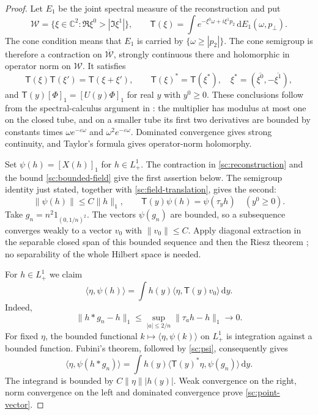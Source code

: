 \documentclass[11pt,letterpaper,reqno]{amsart}
\theoremstyle{definition}
\theoremstyle{remark}
\begin{document}
\begin{proof}
Let $E_1$ be the joint spectral measure of the reconstruction and
put
\[
\mathcal W=\{\xi\in\mathbb C^2:\Re\xi^0>|\Im\xi^1|\},\qquad
\mathsf T(\xi)=\int e^{-\xi^0\omega+i\xi^1p_2}\,
 \mathrm dE_1(\omega,p_\perp).
\]
The cone condition means that $E_1$ is carried by
$\{\omega\ge|p_2|\}$. The cone semigroup is therefore a contraction on
$\overline{\mathcal W}$, strongly continuous there and holomorphic in
operator norm on $\mathcal W$. It satisfies
\[
\mathsf T(\xi)\mathsf T(\xi')=\mathsf T(\xi+\xi'),\qquad
\mathsf T(\xi)^*=\mathsf T(\xi^*),\quad
\xi^*=(\overline{\xi^0},-\overline{\xi^1}),
\]
and $\mathsf T(y)[\Phi]_1=[U(y)\Phi]_1$ for real $y$ with $y^0\ge0$.
These conclusions follow from the spectral-calculus argument in
\cite[Section~8.2]{QEDCurrent}: the multiplier has modulus at most
one on the closed tube, and on a smaller tube its first two
derivatives are bounded by constants times
$\omega e^{-\varepsilon\omega}$ and
$\omega^2e^{-\varepsilon\omega}$. Dominated convergence gives
strong continuity, and Taylor's formula gives operator-norm
holomorphy.

Set $\psi(h)=[X(h)]_1$ for $h\in L^1_+$. The contraction in
\eqref{sc:reconstruction} and the bound \eqref{sc:bounded-field}
give the first assertion below. The semigroup identity just stated,
together with \eqref{sc:field-translation}, gives the second:
\begin{equation}\label{sc:psi}
\|\psi(h)\|\le C\|h\|_1,\qquad
\mathsf T(y)\psi(h)=\psi(\tau_yh)\quad(y^0\ge0).
\end{equation}
Take $g_n=n^2 1_{(0,1/n)^2}$. The vectors $\psi(g_n)$ are bounded, so a
subsequence converges weakly to a vector $v_0$ with $\|v_0\|\le C$.
Apply diagonal extraction in the separable closed span of this bounded
sequence and then the Riesz theorem
\cite[Proposition 3.13 and Lemma 3.11]{Melrose}; no separability of the
whole Hilbert space is needed.

For $h\in L^1_+$ we claim
\begin{equation}\label{sc:point-vector}
\langle\eta,\psi(h)\rangle
 =\int h(y)\langle\eta,\mathsf T(y)v_0\rangle\,\mathrm dy.
\end{equation}
Indeed,
\[
\|h*g_n-h\|_1
 \le\sup_{|a|\le2/n}\|\tau_ah-h\|_1\longrightarrow0.
\]
For fixed $\eta$, the bounded functional
$k\mapsto\langle\eta,\psi(k)\rangle$ on $L^1_+$ is integration against a
bounded function. Fubini's theorem, followed by \eqref{sc:psi}, consequently
gives
\[
\langle\eta,\psi(h*g_n)\rangle
 =\int h(y)\langle\mathsf T(y)^*\eta,\psi(g_n)\rangle\,\mathrm dy.
\]
The integrand is bounded by $C\|\eta\||h(y)|$. Weak convergence on the
right, norm convergence on the left and dominated convergence prove
\eqref{sc:point-vector}.


\end{proof}
\end{document}
